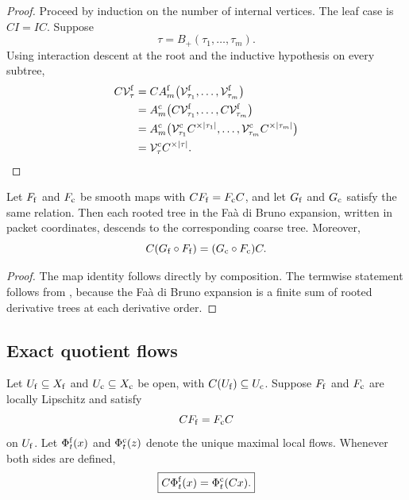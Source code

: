 \begin{proof}
Proceed by induction on the number of internal vertices.  The leaf case is $CI=IC$.  Suppose
\[
  \tau=B_+(\tau_1,\ldots,\tau_m).
\]
Using interaction descent at the root and the inductive hypothesis on every subtree,
\begin{align*}
C\mathcal V_{\tau}^{\mathrm f}
&=
CA_m^{\mathrm f}
\bigl(
\mathcal V_{\tau_1}^{\mathrm f},\ldots,
\mathcal V_{\tau_m}^{\mathrm f}
\bigr)\\
&=
A_m^{\mathrm c}
\bigl(
C\mathcal V_{\tau_1}^{\mathrm f},\ldots,
C\mathcal V_{\tau_m}^{\mathrm f}
\bigr)\\
&=
A_m^{\mathrm c}
\bigl(
\mathcal V_{\tau_1}^{\mathrm c}C^{\times|\tau_1|},\ldots,
\mathcal V_{\tau_m}^{\mathrm c}C^{\times|\tau_m|}
\bigr)\\
&=
\mathcal V_{\tau}^{\mathrm c}C^{\times|\tau|}.
\end{align*}
\end{proof}

\begin{PRIQcorollary}\label{PRIQ:cor:faa-quotient}
Let $F_{\mathrm f}$ and $F_{\mathrm c}$ be smooth maps with $CF_{\mathrm f}=F_{\mathrm c}C$, and let $G_{\mathrm f}$ and $G_{\mathrm c}$ satisfy the same relation.  Then each rooted tree in the Fa\`a di Bruno expansion, written in packet coordinates, descends to the corresponding coarse tree.  Moreover,
\[
  C(G_{\mathrm f}\circ F_{\mathrm f})
  =(G_{\mathrm c}\circ F_{\mathrm c})C.
\]
\end{PRIQcorollary}

\begin{proof}
The map identity follows directly by composition.  The termwise statement follows from , because the Fa\`a di Bruno expansion is a finite sum of rooted derivative trees at each derivative order.
\end{proof}

\subsection{Exact quotient flows}

\begin{PRIQtheorem}\label{PRIQ:thm:exact-quotient-flow}
Let $U_{\mathrm f}\subseteq X_{\mathrm f}$ and $U_{\mathrm c}\subseteq X_{\mathrm c}$ be open, with $C(U_{\mathrm f})\subseteq U_{\mathrm c}$.  Suppose $F_{\mathrm f}$ and $F_{\mathrm c}$ are locally Lipschitz and satisfy
\[
  CF_{\mathrm f}=F_{\mathrm c}C
\]
on $U_{\mathrm f}$.  Let $\Phi_t^{\mathrm f}(x)$ and $\Phi_t^{\mathrm c}(z)$ denote the unique maximal local flows.  Whenever both sides are defined,
\begin{equation}\label{PRIQ:eq:exact-flow-identity}
  \boxed{
  C\Phi_t^{\mathrm f}(x)
  =
  \Phi_t^{\mathrm c}(Cx).}
\end{equation}
\end{PRIQtheorem}

